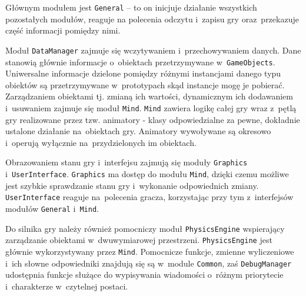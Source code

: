 \documentclass[licencjacka]{pracamgr}
\begin{document}
    Głównym modułem jest \texttt{General} -- to on inicjuje działanie wszystkich pozostałych modułów, reaguje na
    polecenia odczytu i~zapisu gry oraz~przekazuje część informacji pomiędzy nimi.

    Moduł \texttt{DataManager} zajmuje się wczytywaniem i~przechowywaniem danych. Dane stanowią głównie informacje
    o~obiektach przetrzymywane w~\texttt{GameObjects}. Uniwersalne informacje dzielone pomiędzy różnymi instancjami danego
    typu obiektów są przetrzymywane w~prototypach skąd instancje mogę je pobierać. Zarządzaniem obiektami tj. zmianą ich
    wartości, dynamicznym ich dodawaniem i~usuwaniem zajmuje się moduł \texttt{Mind}. \texttt{Mind} zawiera logikę całej
    gry wraz z~pętlą gry realizowane przez tzw. animatory - klasy odpowiedzialne za pewne, dokładnie ustalone działanie
    na~obiektach gry. Animatory wywoływane są okresowo i~operują wyłącznie na~przydzielonych im obiektach.

    Obrazowaniem stanu gry i~interfejsu zajmują się moduły \texttt{Graphics} i~\texttt{UserInterface}.
    \texttt{Graphics} ma dostęp do modułu \texttt{Mind}, dzięki czemu możliwe jest szybkie sprawdzanie stanu
    gry i~wykonanie odpowiednich zmiany. \texttt{UserInterface} reaguje na~polecenia gracza, korzystając przy tym
    z~interfejsów modułów \texttt{General} i~\texttt{Mind}.

    Do silnika gry należy również pomocniczy moduł \texttt{PhysicsEngine} wspierający zarządzanie obiektami w~dwuwymiarowej
    przestrzeni. \texttt{PhysicsEngine} jest głównie wykorzystywany przez \texttt{Mind}. Pomocnicze funkcje, zmienne
    wyliczeniowe i~ich słowne odpowiedniki znajdują się są w~module \texttt{Common}, zaś \texttt{DebugManager} udostępnia
    funkcje służące do wypisywania wiadomości o~różnym priorytecie i~charakterze w~czytelnej postaci.
\end{document}
